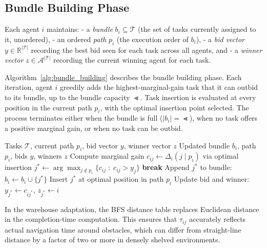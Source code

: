 \subsection{Bundle Building Phase}
\label{subsec:method_bundle}

Each agent $i$ maintains:
  - a \emph{bundle} $b_i \subseteq \mathcal{T}$ (the set of tasks currently
    assigned to it, unordered),
  - an ordered \emph{path} $p_i$ (the execution order of $b_i$),
  - a \emph{bid vector} $y \in \mathbb{R}^{|\mathcal{T}|}$ recording the best bid
    seen for each task across all agents, and
  - a \emph{winner vector} $z \in \mathcal{A}^{|\mathcal{T}|}$ recording the
    current winning agent for each task.

Algorithm~\ref{alg:bundle_building} describes the bundle building phase.
Each iteration, agent $i$ greedily adds the highest-marginal-gain task that it
can outbid to its bundle, up to the bundle capacity $\Lt$.
Task insertion is evaluated at every position in the current path $p_i$, with
the optimal insertion point selected.
The process terminates either when the bundle is full ($|b_i| = \Lt$), when no
task offers a positive marginal gain, or when no task can be outbid.

\begin{algorithm}[htbp]
\caption{GCBBA Bundle Building (agent $i$)}
\label{alg:bundle_building}
\begin{algorithmic}[1]
\Require Tasks $\mathcal{T}$, current path $p_i$, bid vector $y$, winner vector $z$
\Ensure Updated bundle $b_i$, path $p_i$, bids $y$, winners $z$
    \State Compute marginal gain $c_{ij} \leftarrow \Delta_i(j \mid p_i)$ via optimal insertion
  \EndFor
  \State $j^* \leftarrow \arg\max_{j \notin p_i} \bigl\{c_{ij} \;:\; c_{ij} > y_j\bigr\}$
   \textbf{break} \EndIf
  \State Append $j^*$ to bundle: $b_i \leftarrow b_i \cup \{j^*\}$
  \State Insert $j^*$ at optimal position in path $p_i$
  \State Update bid and winner: $y_{j^*} \leftarrow c_{ij^*}$,\; $z_{j^*} \leftarrow i$
\EndWhile
\end{algorithmic}
\end{algorithm}

In the warehouse adaptation, the BFS distance table replaces Euclidean distance
in the completion-time computation.
This ensures that $\tau_{ij}$ accurately reflects actual navigation time around
obstacles, which can differ from straight-line distance by a factor of two or
more in densely shelved environments.


